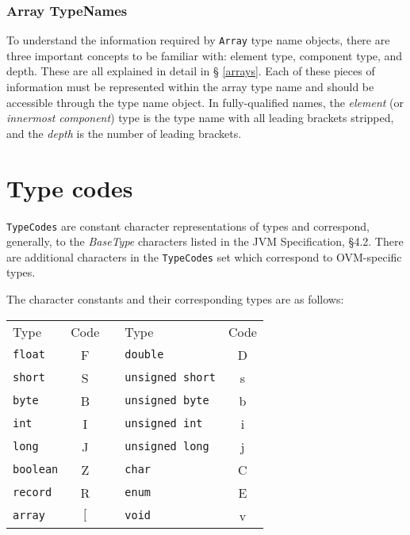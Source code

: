 \documentclass{report}
\begin{document}

\subsubsection{Array TypeNames}

To understand the information required by \texttt{Array} type name objects,
there are three important concepts to be familiar with: element type, 
component type, and depth. These are all explained in detail in \S
\ref{arrays}. Each of these pieces of information must be represented within
the array type name and should be accessible through the type name object.
In fully-qualified names, the {\em element} (or {\em innermost 
component}) type is the type name with all leading brackets stripped, and 
the {\em depth} is the number of leading brackets.


\section{Type codes}\label{typecodes}

\texttt{TypeCodes} are constant character representations of types and
correspond, generally, to the {\em BaseType} characters listed in
the JVM Specification, \S 4.2. There are additional characters
in the \texttt{TypeCodes} set which correspond to OVM-specific types.

\medskip
The character constants and their corresponding types are as follows:
\medskip

\begin{center}
\begin{tabular}{l|c c l|c}
Type & Code & & Type & Code\\
\texttt{float} & F & & \texttt{double} & D \\
\texttt{short} & S & & \texttt{unsigned short} & s \\
\texttt{byte} & B & & \texttt{unsigned byte} & b \\
\texttt{int} & I & & \texttt{unsigned int} & i \\
\texttt{long} & J & & \texttt{unsigned long} & j \\
\texttt{boolean} & Z & & \texttt{char} & C \\
\texttt{record} & R & & \texttt{enum} & E \\
\texttt{array} & $[$ & & \texttt{void} & v 
\end{tabular}
\end{center}
\end{document}
